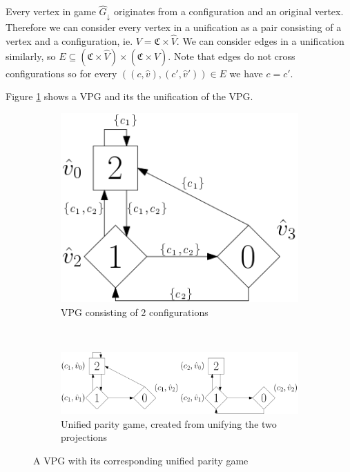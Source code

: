 Every vertex in game $\hat{G}_{\downarrow}$ originates from a configuration and an original vertex. Therefore we can consider every vertex in a unification as a pair consisting of a vertex and a configuration, ie. $V = \mathfrak{C} \times \hat{V}$. We can consider edges in a unification similarly, so $E \subseteq (\mathfrak{C} \times \hat{V}) \times (\mathfrak{C} \times \hat{V})$. Note that edges do not cross configurations so for every $((c,\hat{v}) , (c',\hat{v}')) \in E$ we have $c = c'$. 
\begin{example}
Figure \ref{fig:VPG2UPG} shows a VPG and its the unification of the VPG.
	\begin{figure}[h]
		\centering
		\begin{subfigure}{1\textwidth}
			\centering
			\includegraphics[scale=0.4]{Examples/UPG/VPG}
			\caption{VPG consisting of 2 configurations}
		\end{subfigure}\\
		\begin{subfigure}{1\textwidth}
			\centering
			\includegraphics[scale=0.4]{Examples/UPG/UPG}
			\caption{Unified parity game, created from unifying the two projections}
		\end{subfigure}
		\caption{A VPG with its corresponding unified parity game}
		\label{fig:VPG2UPG}
	\end{figure}
\end{example}

